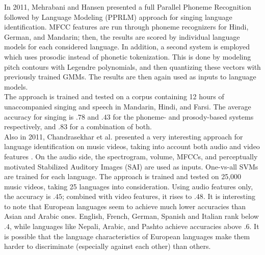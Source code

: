 \medskip
In 2011, Mehrabani and Hansen presented a full Parallel Phoneme Recognition followed by Language Modeling (PPRLM) approach for singing language identification. MFCC features are run through phoneme recognizers for Hindi, German, and Mandarin; then, the results are scored by individual language models for each considered language. In addition, a second system is employed which uses prosodic instead of phonetic tokenization. This is done by modeling pitch contours with Legendre polynomials, and then quantizing these vectors with previously trained GMMs. The results are then again used as inputs to language models.\\
The approach is trained and tested on a corpus containing 12 hours of unaccompanied singing and speech in Mandarin, Hindi, and Farsi. The average accuracy for singing is $.78$ and $.43$ for the phoneme- and prosody-based systems respectively, and $.83$ for a combination of both.\\
\medskip
Also in 2011, Chandrasekhar et al. presented a very interesting approach for language identification on music videos, taking into account both audio and video features \cite {chandrasekhar}. On the audio side, the spectrogram, volume, MFCCs, and perceptually motivated Stabilized Auditory Images (SAI) are used as inputs. One-vs-all SVMs are trained for each language. The approach is trained and tested on 25,000 music videos, taking 25 languages into consideration. Using audio features only, the accuracy is $.45$; combined with video features, it rises to $.48$. It is interesting to note that European languages seem to achieve much lower accuracies than Asian and Arabic ones. English, French, German, Spanish and Italian rank below $.4$, while languages like Nepali, Arabic, and Pashto achieve accuracies above $.6$. It is possible that the language characteristics of European languages make them harder to discriminate (especially against each other) than others.

